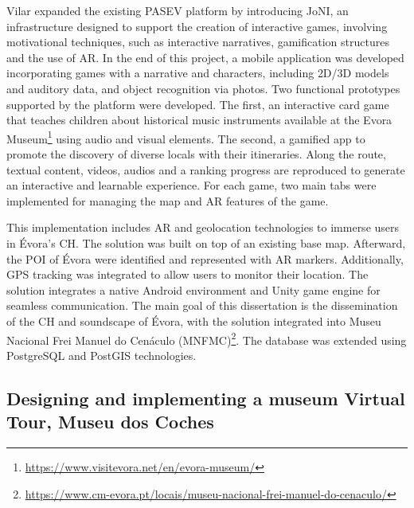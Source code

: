 Vilar expanded the existing \gls{PASEV} platform by introducing JoNI, an infrastructure designed to support the creation of interactive games, involving motivational techniques, such as interactive narratives, gamification structures and the use of \gls{AR}. In the end of this project, a mobile 
application was developed incorporating games with a narrative and characters, including \gls{2D}/\gls{3D} models and auditory data, and object recognition via photos. Two 
functional prototypes supported by the platform were developed. The first, an interactive card game that teaches children about historical music instruments available at the Evora Museum\footnote{\url{https://www.visitevora.net/en/evora-museum/}} using audio and visual elements. The second, a gamified app to promote the discovery 
of diverse locals with their itineraries. Along the route, textual content, videos, audios and a ranking progress are reproduced to generate an interactive and learnable experience. 
For each game, two main tabs were implemented for managing the map and \gls{AR} features of the game. 

This implementation includes \gls{AR} and geolocation technologies to immerse users in Évora's \gls{CH}.
The solution was built on top of an existing base map. Afterward, the \gls{POI} of Évora were identified and represented with \gls{AR} markers. Additionally, GPS tracking was
integrated to allow users to monitor their location.
The solution integrates a native Android environment and Unity game engine for seamless communication. The main goal of this dissertation is the dissemination of the \gls{CH} 
and soundscape of Évora, with the solution integrated into Museu Nacional Frei Manuel do Cenáculo (MNFMC)\footnote{\url{https://www.cm-evora.pt/locais/museu-nacional-frei-manuel-do-cenaculo/}}. 
The database was extended using PostgreSQL and PostGIS technologies.

\subsection{Designing and implementing a museum Virtual Tour, Museu dos Coches}
\label{sec:thesis2_nova}

